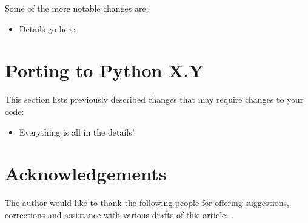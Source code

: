\documentclass{howto}
\begin{document}
Some of the more notable changes are:

\begin{itemize}

\item Details go here.

\end{itemize}


\section{Porting to Python X.Y}

This section lists previously described changes that may require
changes to your code:

\begin{itemize}

\item Everything is all in the details!

\end{itemize}


\section{Acknowledgements \label{acks}}

The author would like to thank the following people for offering
suggestions, corrections and assistance with various drafts of this
article: .
\end{document}
